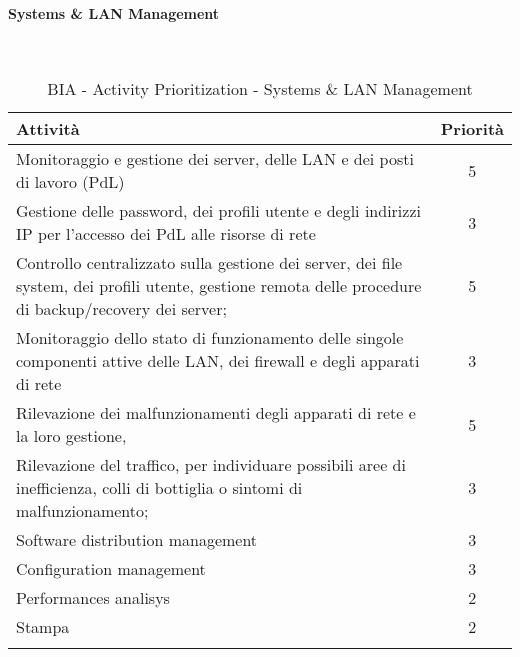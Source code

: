 \newpage
\paragraph{Systems \& LAN Management}
\textcolor{white}{.} \\
\renewcommand\arraystretch{1,5}
\begin{longtable}{p{11cm} c }
\toprule
\textbf{Attività} & \textbf{Priorità} \\
\toprule
Monitoraggio e gestione dei server, delle LAN e dei posti di lavoro (PdL) & 5 \\
Gestione delle password, dei profili utente e degli indirizzi IP per l’accesso dei PdL alle risorse di rete  & 3 \\
Controllo  centralizzato  sulla  gestione  dei  server,  dei  file  system,    dei   profili   utente, gestione remota delle procedure di backup/recovery dei server;  & 5 \\
Monitoraggio  dello  stato  di  funzionamento  delle  singole  componenti  attive  delle LAN, dei firewall e degli apparati di rete  & 3 \\
Rilevazione dei malfunzionamenti degli apparati di rete e la loro gestione, & 5 \\
Rilevazione del traffico, per individuare possibili aree di inefficienza, colli di bottiglia o sintomi di malfunzionamento;   & 3 \\
Software distribution management  & 3 \\
Configuration management & 3\\
Performances analisys & 2 \\
Stampa & 2 \\
\bottomrule
\caption{BIA - Activity Prioritization - Systems \& LAN Management}
\end{longtable}

\newpage

